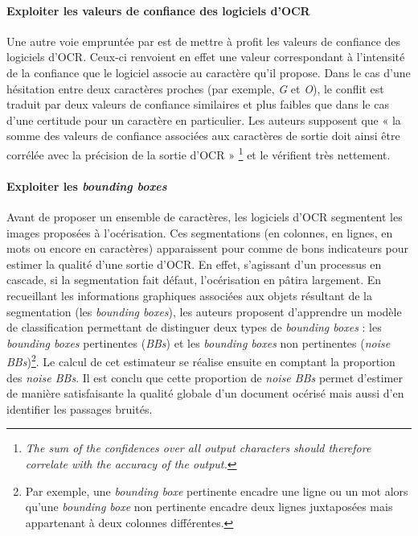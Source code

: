 \documentclass[10pt,twoside]{article}
\begin{document}
    \paragraph{Exploiter les valeurs de confiance des logiciels d'OCR}
    Une autre voie empruntée par \cite{Springmann2016a} est de mettre à profit les valeurs de confiance 
    des logiciels d'OCR. Ceux-ci renvoient en effet une valeur correspondant à l'intensité de la confiance que le
    logiciel associe au caractère qu'il propose. Dans le cas d'une hésitation entre deux caractères
    proches (par exemple, \textit{G} et \textit{O}), le conflit est traduit par deux valeurs de confiance similaires et plus
    faibles que dans le cas d'une certitude pour un caractère en particulier. Les auteurs supposent que « la somme des 
    valeurs de confiance associées aux caractères de sortie doit ainsi être corrélée avec la précision de la sortie d'OCR »
    \footnote{\textit{The sum of the confidences over all output characters should therefore correlate with the accuracy of the output.}} et le vérifient très nettement.

    \paragraph{Exploiter les \textit{bounding boxes}}
    Avant de proposer un ensemble de caractères, les logiciels d'OCR segmentent les images proposées à l'océrisation. Ces
    segmentations (en colonnes, en lignes, en mots ou encore en caractères) apparaissent pour \cite{Gupta2015a}
    comme de bons indicateurs pour estimer la qualité d'une sortie d'OCR. En effet, s'agissant d'un processus en cascade,
    si la segmentation fait défaut, l'océrisation en pâtira largement. En recueillant les informations graphiques associées
    aux objets résultant de la segmentation (les \textit{bounding boxes}), les auteurs proposent d'apprendre un modèle de 
    classification permettant de distinguer deux types de \textit{bounding boxes} : les \textit{bounding boxes} pertinentes
    (\textit{BBs}) et les \textit{bounding boxes} non pertinentes (\textit{noise BBs})\footnote{Par exemple, une 
    \textit{bounding boxe} pertinente encadre une ligne ou un mot alors qu'une \textit{bounding boxe} non pertinente 
    encadre deux lignes juxtaposées mais appartenant à deux colonnes différentes.}. Le calcul de cet estimateur se 
    réalise ensuite en comptant la proportion des \textit{noise BBs}. Il est conclu que cette proportion de \textit{noise BBs}
    permet d'estimer de manière satisfaisante la qualité globale d'un document océrisé mais aussi d'en identifier les 
    passages bruités.
\end{document}
